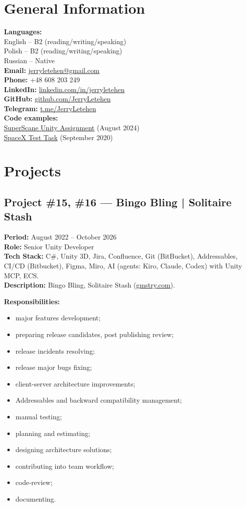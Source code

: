\documentclass[letterpaper,11pt]{article}
\newcommand{\project}[6]{%
  \par\addvspace{20pt}%
  \noindent\begin{minipage}{\linewidth}
  \subsection*{#1}
  \textbf{Period:} #2 \\
  \textbf{Role:} #5 \\
  \textbf{Tech Stack:} #4 \\
  \textbf{Description:} #3
  \par\smallskip
  \textbf{Responsibilities:}
  \begin{itemize}[leftmargin=1.4em,itemsep=1pt,topsep=2pt,parsep=0pt]
    #6
  \end{itemize}
  \end{minipage}%
  \par\addvspace{20pt}%
}
\begin{document}
\section*{General Information}
\textbf{Languages:} \\
\hspace*{1.4em} English -- B2 (reading/writing/speaking) \\
\hspace*{1.4em} Polish -- B2 (reading/writing/speaking) \\
\hspace*{1.4em} Russian -- Native \\
\textbf{Email:} \href{mailto:jerryletehen@gmail.com}{jerryletehen@gmail.com} \\
\textbf{Phone:} +48 608 203 249 \\
\textbf{LinkedIn:} \href{https://www.linkedin.com/in/jerryletehen/}{linkedin.com/in/jerryletehen} \\
\textbf{GitHub:} \href{https://github.com/JerryLetehen}{github.com/JerryLetehen} \\
\textbf{Telegram:} \href{https://t.me/JerryLetehen}{t.me/JerryLetehen} \\
\textbf{Code examples:} \\
\hspace*{1.4em} \href{https://gitfront.io/r/JerryLetehen/t7acD6K3LLKV/SuperScaneUnityAssignmentAugust2024/}{SuperScane Unity Assignment} (August 2024) \\
\hspace*{1.4em} \href{https://gitfront.io/r/JerryLetehen/SpaceXTestTask/}{SpaceX Test Task} (September 2020)

\section*{Projects}

\project{Project \#15, \#16 --- Bingo Bling | Solitaire Stash}
  {August 2022 -- October 2026}
  {Bingo Bling, Solitaire Stash (\href{https://gmstry.com/}{gmstry.com}).}
  {C\#, Unity 3D, Jira, Confluence, Git (BitBucket), Addressables, CI/CD (Bitbucket), Figma, Miro, AI (agents: Kiro, Claude, Codex) with Unity MCP, ECS.}
  {Senior Unity Developer}
  {
    \item major features development;
    \item preparing release candidates, post publishing review;
    \item release incidents resolving;
    \item release major bugs fixing;
    \item client-server architecture improvements;
    \item Addressables and backward compatibility management;
    \item manual testing;
    \item planning and estimating;
    \item designing architecture solutions;
    \item contributing into team workflow;
    \item code-review;
    \item documenting.
  }
\end{document}
